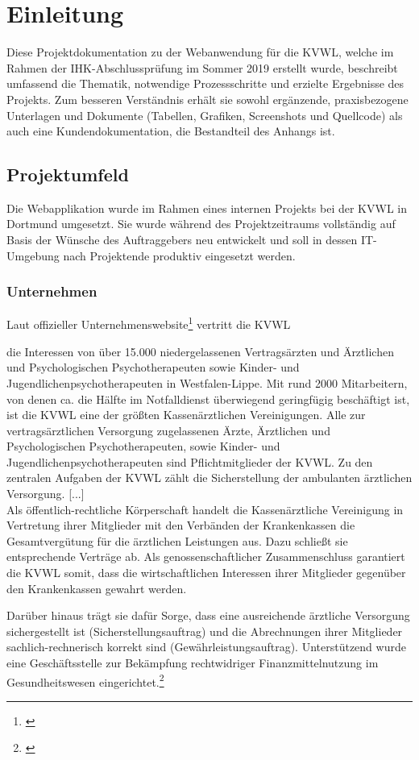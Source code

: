 \section{Einleitung}
\label{sec:Einleitung}
Diese Projektdokumentation zu der Webanwendung \projektName für die \ac{KVWL}, welche im Rahmen der IHK-Abschlussprüfung im Sommer 2019 erstellt wurde, beschreibt umfassend die Thematik, notwendige Prozessschritte und erzielte Ergebnisse des Projekts. Zum besseren Verständnis erhält sie sowohl ergänzende, praxisbezogene Unterlagen und Dokumente (Tabellen, Grafiken, Screenshots und Quellcode) als auch eine Kundendokumentation, die Bestandteil des Anhangs ist.

\subsection{Projektumfeld} 
\label{sec:Projektumfeld}
Die Webapplikation wurde im Rahmen eines internen Projekts bei der \ac{KVWL} in Dortmund umgesetzt. Sie wurde während des Projektzeitraums vollständig auf Basis der Wünsche des Auftraggebers neu entwickelt und soll in dessen IT-Umgebung nach Projektende produktiv eingesetzt werden.

\subsubsection{Unternehmen} 
\label{sec:Unternehmen}
Laut offizieller Unternehmenswebsite\footnote{\cite{KVWL}} vertritt die \ac{KVWL}
\begin{displayquote}
	die Interessen von über 15.000 niedergelassenen Vertragsärzten und Ärztlichen und Psychologischen Psychotherapeuten sowie Kinder- und Jugendlichenpsychotherapeuten in Westfalen-Lippe. Mit rund 2000 Mitarbeitern, von denen ca. die Hälfte im Notfalldienst überwiegend geringfügig beschäftigt ist, ist die \ac{KVWL} eine der größten Kassenärztlichen Vereinigungen. Alle zur vertragsärztlichen Versorgung zugelassenen Ärzte, Ärztlichen und Psychologischen Psychotherapeuten, sowie Kinder- und Jugendlichenpsychotherapeuten sind Pflichtmitglieder der \ac{KVWL}. Zu den zentralen Aufgaben der \ac{KVWL} zählt die Sicherstellung der ambulanten ärztlichen Versorgung. [...]\\
	Als öffentlich-rechtliche Körperschaft handelt die Kassenärztliche Vereinigung in Vertretung ihrer Mitglieder mit den Verbänden der Krankenkassen die Gesamtvergütung für die ärztlichen Leistungen aus. Dazu schließt sie entsprechende Verträge ab. Als genossenschaftlicher Zusammenschluss garantiert die \ac{KVWL} somit, dass die wirtschaftlichen Interessen ihrer Mitglieder gegenüber den Krankenkassen gewahrt werden.
\end{displayquote}
Darüber hinaus trägt sie dafür Sorge, dass eine ausreichende ärztliche Versorgung sichergestellt ist (Sicherstellungsauftrag) und die Abrechnungen ihrer Mitglieder sachlich-rechnerisch korrekt sind (Gewährleistungsauftrag). Unterstützend wurde eine Geschäftsstelle zur Bekämpfung rechtwidriger Finanzmittelnutzung im Gesundheitswesen eingerichtet.\footnote{\Vgl \cite{KVWL}}


